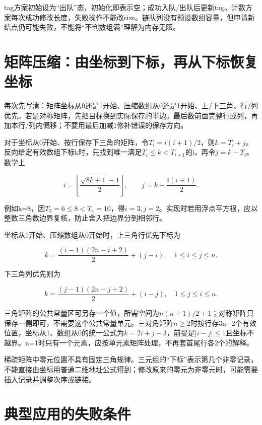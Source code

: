 tag方案初始设为``出队''态，初始化即表示空；成功入队/出队后更新tag。计数方案每次成功修改长度，失败操作不能改size。链队列没有预设数组容量，但申请新结点仍可能失败，不能将``不判数组满''理解为内存无限。

\section{矩阵压缩：由坐标到下标，再从下标恢复坐标}\label{DS03-matrix-method}

\begin{methodbox}[完整行数加行内偏移]

每次先写清：矩阵坐标从0还是1开始、压缩数组从0还是1开始、上/下三角、行/列优先。若是对称矩阵，先把目标换到实际保存的半边。最后数前面完整行或列，再加本行/列内偏移；不要用最后加减1修补错误的保存方向。

\end{methodbox}

对于坐标从0开始、按行保存下三角的矩阵，令\(T_i=i(i+1)/2\)，则\(k=T_i+j\)。反向给定有效数组下标k时，先找到唯一满足\(T_i\le k<T_{i+1}\)的i，再令\(j=k-T_i\)。数学上

\[i=\left\lfloor\frac{\sqrt{8k+1}-1}{2}\right\rfloor,\qquad j=k-\frac{i(i+1)}2.\]

例如k=8，因\(T_3=6\le8<T_4=10\)，得\(i=3,j=2\)。实现时若用浮点平方根，应以整数三角数边界复核，防止舍入把边界分到相邻行。

坐标从1开始、压缩数组从0开始时，上三角行优先下标为

\[k=\frac{(i-1)(2n-i+2)}2+(j-i),\quad1\le i\le j\le n.\]

下三角列优先则为

\[k=\frac{(j-1)(2n-j+2)}2+(i-j),\quad1\le j\le i\le n.\]

三角矩阵的公共常量区可另存一个值，所需空间为\(n(n+1)/2+1\)；对称矩阵只保存一侧即可，不需要这个公共常量单元。三对角矩阵\(n\ge2\)时按行存3n\ensuremath{-}2个有效位置，坐标从1、数组从0的统一公式为\(k=2i+j-3\)，前提是\(|i-j|\le1\)且坐标不越界。n=1时只有一个元素，应按单元素矩阵处理，不再套首尾行各2个的解释。

稀疏矩阵中零元位置不具有固定三角规律。三元组的``下标''表示第几个非零记录，不能直接由坐标用普通二维地址公式得到；修改原来的零元为非零元时，可能需要插入记录并调整次序或链接。

\section{典型应用的失败条件}\label{DS03-app-method}

